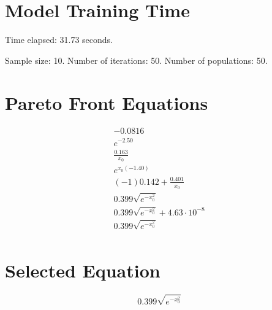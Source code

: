 \documentclass{article}
\begin{document}
\section*{Model Training Time}
Time elapsed: 31.73 seconds.

Sample size: 10.
Number of iterations: 50.
Number of populations: 50.

\section*{Pareto Front Equations}
\begin{align*}
-0.0816 \\
e^{-2.50} \\
\frac{0.163}{x_{0}} \\
e^{x_{0} \left(-1.40\right)} \\
\left(-1\right) 0.142 + \frac{0.401}{x_{0}} \\
0.399 \sqrt{e^{- x_{0}^{2}}} \\
0.399 \sqrt{e^{- x_{0}^{2}}} + 4.63 \cdot 10^{-8} \\
0.399 \sqrt{e^{- x_{0}^{2}}} \\
\end{align*}

\section*{Selected Equation}
\[ 0.399 \sqrt{e^{- x_{0}^{2}}} \]
\end{document}
